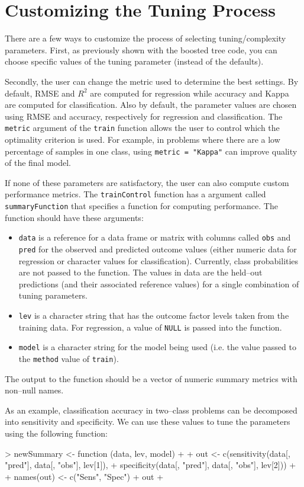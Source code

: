 \documentclass[12pt]{article}
\begin{document}
\clearpage

\section{Customizing the Tuning Process}

There are a few ways to customize the process of selecting tuning/complexity parameters. First, as previously shown with the boosted tree code, you can choose specific values of the tuning parameter (instead of the defaults).

Secondly, the user can change the metric used to determine the best settings. By default, RMSE and $R^2$ are computed for regression while accuracy and Kappa are computed for classification. Also by default, the parameter values are chosen using RMSE and accuracy, respectively  for regression and classification. The \texttt{metric} argument of the \texttt{train} function allows the user to control which the optimality criterion is used. For example, in problems where there are a low percentage of samples in one class, using \texttt{metric = "Kappa"} can improve quality of the final model.

If none of these parameters are satisfactory, the user can also compute custom performance metrics. The \texttt{trainControl} function has a argument called \texttt{summaryFunction} that specifies a function for computing performance. The function should have these arguments:
\begin{itemize}
\item \texttt{data} is a reference for a data frame or matrix with columns called \texttt{obs} and \texttt{pred} for the observed and predicted outcome values (either numeric data for regression or character values for classification). Currently, class probabilities are not passed to the function. The values in data are the held--out predictions (and their associated reference values) for a single combination of tuning parameters.
\item \texttt{lev} is a character string that has the outcome factor levels taken from the training data. For regression, a value of \texttt{NULL} is passed into the function.
\item \texttt{model} is a character string for the model being used (i.e. the value passed to the \texttt{method} value of \texttt{train}).
\end{itemize}
The output to the function should be a vector of numeric summary metrics with non--null names. 

As an example, classification accuracy in two--class problems can be decomposed into sensitivity and specificity. We can use these values to tune the parameters using the following function:
\begin{Schunk}
\begin{Sinput}
> newSummary <- function (data, lev, model)
+   {
+     out <- c(sensitivity(data[, "pred"], data[, "obs"], lev[1]),
+       specificity(data[, "pred"], data[, "obs"], lev[2]))
+     
+     names(out) <- c("Sens", "Spec")
+     out
+   }
\end{Sinput}
\end{Schunk}
\end{document}
